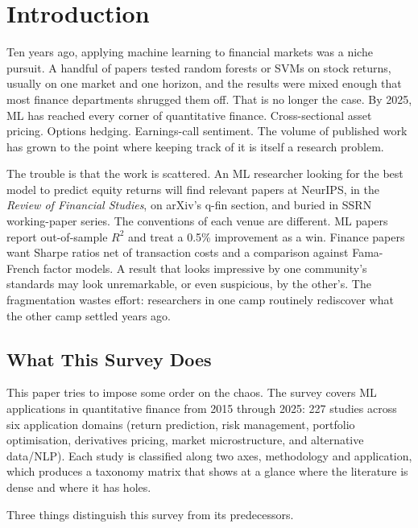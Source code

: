 \section{Introduction}\label{sec:introduction}

Ten years ago, applying machine learning to financial markets was a niche
pursuit. A handful of papers tested random forests or SVMs on stock
returns, usually on one market and one horizon, and the results were mixed
enough that most finance departments shrugged them off. That is no longer
the case. By 2025, ML has reached every corner of quantitative finance.
Cross-sectional asset pricing. Options hedging. Earnings-call sentiment.
The volume of published work has grown to the point where keeping track of
it is itself a research problem.

The trouble is that the work is scattered. An ML researcher looking for
the best model to predict equity returns will find relevant papers at
NeurIPS, in the \textit{Review of Financial Studies}, on arXiv's q-fin
section, and buried in SSRN working-paper series. The conventions of each
venue are different. ML papers report out-of-sample $R^2$ and treat a
0.5\% improvement as a win. Finance papers want Sharpe ratios net of
transaction costs and a comparison against Fama-French factor models. A
result that looks impressive by one community's standards may look
unremarkable, or even suspicious, by the other's. The fragmentation wastes
effort: researchers in one camp routinely rediscover what the other camp
settled years ago.

\subsection{What This Survey Does}

This paper tries to impose some order on the chaos. The survey covers ML
applications in quantitative finance from 2015 through 2025: 227 studies
across six application domains (return prediction, risk management,
portfolio optimisation, derivatives pricing, market microstructure, and
alternative data/NLP). Each study is classified along two axes,
methodology and application, which produces a taxonomy matrix that shows
at a glance where the literature is dense and where it has holes.

Three things distinguish this survey from its predecessors.

